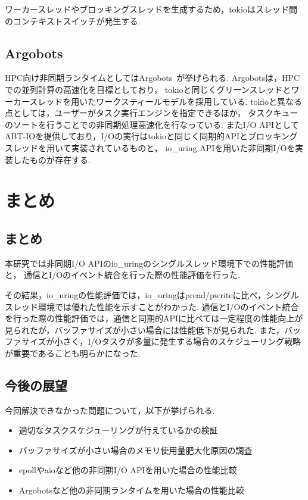 \documentclass[a4paper,11pt]{jreport}
\begin{document}
ワーカースレッドやブロッキングスレッドを生成するため，tokioはスレッド間のコンテキストスイッチが発生する.

\section{Argobots}
HPC向け非同期ランタイムとしてはArgobots~\cite{argobots}が挙げられる.
Argobotsは，HPCでの並列計算の高速化を目標としており，
tokioと同じくグリーンスレッドとワーカースレッドを用いたワークスティールモデルを採用している.
tokioと異なる点としては，ユーザーがタスク実行エンジンを指定できるほか，
タスクキューのソートを行うことでの非同期処理高速化を行なっている.
またI/O APIとしてABT-IOを提供しており，I/Oの実行はtokioと同じく同期的APIとブロッキングスレッドを用いて実装されているものと，
io\_uring APIを用いた非同期I/Oを実装したものが存在する.


\chapter{まとめ}
\section{まとめ}
本研究では非同期I/O APIのio\_uringのシングルスレッド環境下での性能評価と，
通信とI/Oのイベント統合を行った際の性能評価を行った.

その結果，io\_uringの性能評価では，io\_uringはpread/pwriteに比べ，シングルスレッド環境では優れた性能を示すことがわかった.
通信とI/Oのイベント統合を行った際の性能評価では，通信と同期的APIに比べては一定程度の性能向上が見られたが，バッファサイズが小さい場合には性能低下が見られた.
また，バッファサイズが小さく，I/Oタスクが多量に発生する場合のスケジューリング戦略が重要であることも明らかになった.

\section{今後の展望}
今回解決できなかった問題について，以下が挙げられる.

\begin{itemize}
	\item 適切なタスクスケジューリングが行えているかの検証
	\item バッファサイズが小さい場合のメモリ使用量肥大化原因の調査
	\item epollやaioなど他の非同期I/O APIを用いた場合の性能比較
	\item Argobotsなど他の非同期ランタイムを用いた場合の性能比較
\end{itemize}
\end{document}

